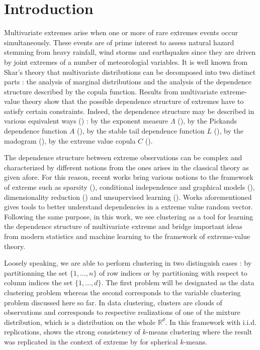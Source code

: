 \documentclass[11pt]{article}
\theoremstyle{definition}
\begin{document}
	\section{Introduction}
	Multivariate extremes arise when one or more of rare extremes events occur simultaneously. These events are of prime interest to assess natural hazard stemming from heavy rainfall, wind storms and earthquakes since they are driven by joint extremes of a number of meteorologial variables. It is well known from Skar's theory \cite{Skla59} that multivariate distributions can be decomposed into two distinct parts : the analysis of marginal distributions and the analysis of the dependence structure described by the copula function. Results from multivariate extreme-value theory show that the possible dependence structure of extremes have to satisfy certain constraints. Indeed, the dependence structure may be described in various equivalent ways (\cite{beirlant2004statistics,de2006extreme, resnick2008extreme}) : by the exponent measure $\Lambda$ (\cite{balkema1977max}), by the Pickands dependence function $A$ (\cite{pickands1981multivariate}), by the stable tail dependence function $L$ (\cite{huang1992statistics}), by the madogram (\cite{naveau2009modelling}), by the extreme value copula $C$ (\cite{gudendorf2010}).
	
	The dependence structure between extreme observations can be complex and characterized by different notions from the ones arises in the classical theory as given afore. For this reason, recent works bring various notions to the framework of extreme such as sparsity (\cite{goix2015learning,meyer2021sparse, simpson2020determining}), conditional independence and graphical models (\cite{engelke2020graphical, gissibl2018max,segers2020one}), dimensionality reduction (\cite{chautru2015dimension, drees2021principal}) and unsupervised learning (\cite{cooley2019decompositions, janssen2020k}). Works aforementioned gives tools to better understand dependencies in a extreme value random vector. Following the same purpose, in this work, we see clustering as a tool for learning the dependence structure of multivariate extreme and bridge important ideas from modern statistics and machine learning to the framework of extreme-value theory.
	
	Loosely speaking, we are able to perform clustering in two distinguish cases : by partitionning the set $\{1,\dots, n\}$ of row indices or by partitioning with respect to column indices the set $\{1,\dots,d\}$. The first problem will be designated as the data clustering problem whereas the second corresponds to the variable clustering problem discussed here so far. In data clustering, clusters are clouds of observations and corresponds to respective realizations of one of the mixture distribution, which is a distribution on the whole $\mathbb{R}^d$. In this framework with i.i.d. replications, \cite{pollard1981strong} shows the strong consistency of $k$-means clustering where the result was replicated in the context of extreme by \cite{janssen2020k} for spherical $k$-means.
	
\end{document}
